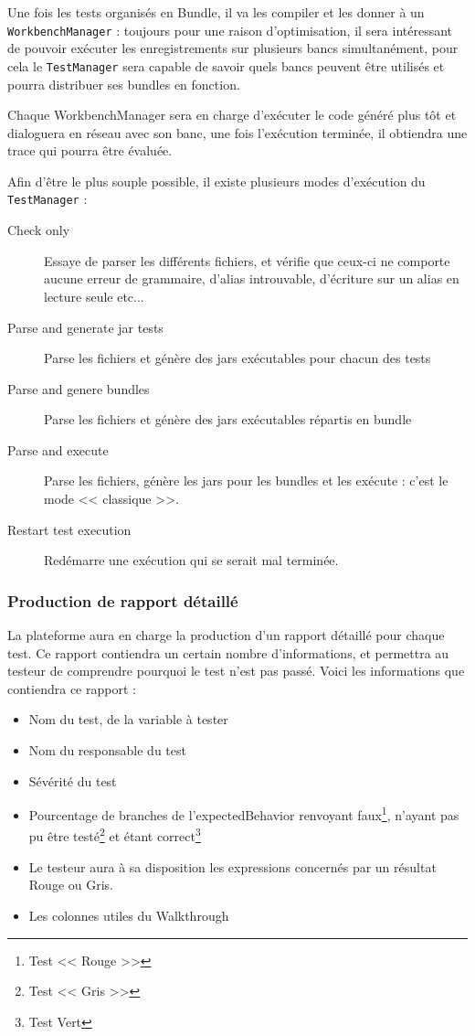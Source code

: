 	Une fois les tests organisés en Bundle, il va les compiler et les donner à un \texttt{WorkbenchManager} : toujours pour une raison d'optimisation, il sera intéressant de pouvoir exécuter les enregistrements sur plusieurs bancs simultanément, pour cela le \texttt{TestManager} sera capable de savoir quels bancs peuvent être utilisés et pourra distribuer ses bundles en fonction. 

	Chaque WorkbenchManager sera en charge d'exécuter le code généré plus tôt et dialoguera en réseau avec son banc, une fois l'exécution terminée, il obtiendra une trace qui pourra être évaluée.

	Afin d'être le plus souple possible, il existe plusieurs modes d'exécution du \texttt{TestManager} : 
	\begin{description}
		\item[Check only] Essaye de parser les différents fichiers, et vérifie que ceux-ci ne comporte aucune erreur de grammaire, d'alias introuvable, d'écriture sur un alias en lecture seule etc...
		\item[Parse and generate jar tests] Parse les fichiers et génère des jars exécutables pour chacun des tests
		\item[Parse and genere bundles] Parse les fichiers et génère des jars exécutables répartis en bundle
		\item[Parse and execute] Parse les fichiers, génère les jars pour les bundles et les exécute : c'est le mode << classique >>.
		\item[Restart test execution] Redémarre une exécution qui se serait mal terminée.
	\end{description}
	\subsubsection{Production de rapport détaillé}\label{report}
	La plateforme aura en charge la production d'un rapport détaillé pour chaque test. Ce rapport contiendra un certain nombre d'informations, et permettra au testeur de comprendre pourquoi le test n'est pas passé. Voici les informations que contiendra ce rapport : 

	\begin{itemize}
		\item Nom du test, de la variable à tester
		\item Nom du responsable du test
		\item Sévérité du test
		\item Pourcentage de branches de l'expectedBehavior renvoyant faux\footnote{Test << Rouge >>}, n'ayant pas pu être testé\footnote{Test << Gris >>} et étant correct\footnote{Test Vert}
		\item Le testeur aura à sa disposition les expressions concernés par un résultat Rouge ou Gris.
		\item Les colonnes utiles du Walkthrough
	\end{itemize}

